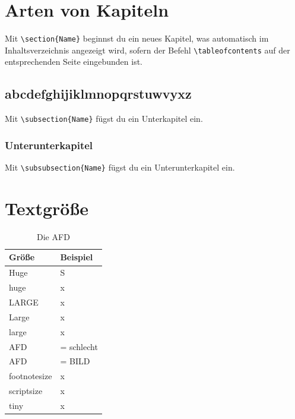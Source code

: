 \documentclass[50pt, a4paper]{article}
\begin{document}
\begin{table}[h]
\section{Arten von Kapiteln}

Mit \verb|\section{Name}| beginnst du ein neues Kapitel, was automatisch im Inhaltsverzeichnis angezeigt wird, sofern der Befehl \verb|\tableofcontents| auf der entsprechenden Seite eingebunden ist.

\subsection{abcdefghijiklmnopqrstuwvyxz}

Mit \verb|\subsection{Name}| f\"ugst du ein Unterkapitel ein.

\subsubsection{Unterunterkapitel}

Mit \verb|\subsubsection{Name}| f\"ugst du ein Unterunterkapitel ein.

\section{Textgr\"o\ss e}


\begin{tabular}{l | l}
\bf{Gr\"o\ss e} & \bf{Beispiel} \\
\hline 
Huge & S\\
\hline
huge & x\\
\hline
LARGE & x\\
\hline
Large & x\\
\hline 
large & x\\
\hline
AFD & = schlecht\\
\hline
AFD & = BILD\\
\hline
footnotesize & x\\
\hline
scriptsize & x\\
\hline
tiny & x\\
\end{tabular}
\caption{\label{tab4}Die AFD }
\end{table}
\end{document}
